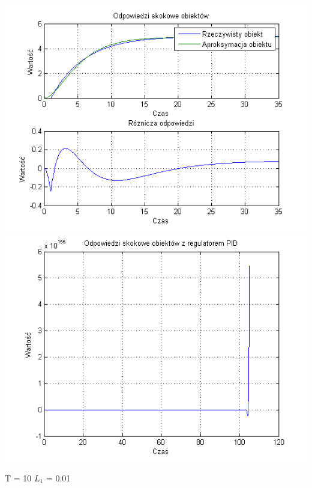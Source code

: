 \documentclass[10pt,a4paper]{article}
\begin{document}
\begin{center}
\includegraphics[scale=1]{images/dwa/skrypt_205.png}\\
\includegraphics[scale=1]{images/dwa/skrypt_206.png}\\
\end{center}
\newpage
T = 10
$L_1$ = 0.01
\end{document}
